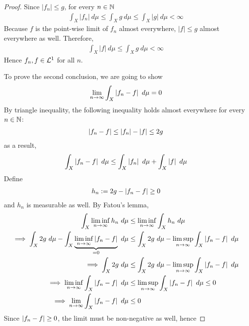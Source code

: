 \documentclass[11pt]{article}
\numberwithin{equation}{section}
\begin{document}
	\begin{proof}
	    Since $|f_n| \leq g$, for every $n \in \mathbb{N}$
	    \begin{align}
	        \int_X |f_n|\ d\mu \leq \int_X g\ d\mu \leq \int_X |g|\ d\mu < \infty
	    \end{align}
	    Because $f$ is the point-wise limit of $f_n$ almost everywhere, $|f| \leq g$ almost everywhere as well.
	    Therefore,
	    \begin{align}
	        \int_X |f|\ d\mu \leq \int_X g\ d\mu < \infty
	    \end{align}
	    Hence $f_n, f \in \mathcal{{L}}^1$ for all $n$.
	    
	    To prove the second conclusion, we are going to show
	    \begin{align}
	        \lim_{n \to \infty} \int_X \left \vert {f_n - f} \right \vert\ d\mu = 0
	    \end{align}
	    By triangle inequality, the following inequality holds almost everywhere for every $n \in \mathbb{N}$:
	    \begin{align}
	        \left \vert {f_n - f} \right \vert \leq \left \vert {f_n} \right \vert - \left \vert {f} \right \vert \leq 2 g
	    \end{align}
	    as a result,
	    \begin{align}
	        \int_X  \left \vert {f_n - f} \right \vert\ d\mu \leq \int_X \left \vert {f_n} \right \vert\ d\mu + \int_X \left \vert {f} \right \vert\ d\mu
	    \end{align}
	    Define
	    \begin{align}
            h_n := 2g - \left \vert {f_n - f} \right \vert \geq 0
	    \end{align}
	    and $h_n$ is measurable as well. By Fatou's lemma,
	    \begin{align}
	        \int_X \liminf_{n\to\infty} h_n\ d\mu &\leq  \liminf_{n\to\infty} \int_X h_n\ d\mu \\
	        \implies
	        \int_X 2g\ d\mu - \int_X \underbrace{\liminf_{n \to \infty} \left \vert {f_n - f} \right \vert}_{=0}\ d\mu &\leq \int_X 2g\ d\mu - \limsup_{n\to\infty} \int_X \left \vert {f_n - f} \right \vert\ d\mu \\
	        \implies
	        \int_X 2g\ d\mu &\leq \int_X 2g\ d\mu - \limsup_{n\to\infty} \int_X \left \vert {f_n - f} \right \vert\ d\mu \\
	        \implies
	        \liminf_{n\to\infty} \int_X \left \vert {f_n - f} \right \vert\ d\mu &\leq \limsup_{n\to\infty} \int_X \left \vert {f_n - f} \right \vert\ d\mu \leq 0 \\
	        \implies \lim_{n \to \infty}\int_X \left \vert {f_n - f} \right \vert\ d\mu &\leq 0
	    \end{align}
	    Since $\left \vert {f_n - f} \right \vert \geq 0$, the limit must be non-negative as well, hence

\end{proof}
\end{document}
